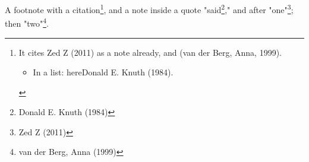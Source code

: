 A footnote with a citation\footnote{It cites Zed Z (2011) as a note already, and (van der Berg, Anna, 1999).
\begin{itemize}
\item In a list: hereDonald E. Knuth (1984).
\end{itemize}}, and a note inside a quote "said\footnote{Donald E. Knuth (1984)},"
and after "one"\footnote{Zed Z (2011)}; then "two"\footnote{van der Berg, Anna (1999)}.
